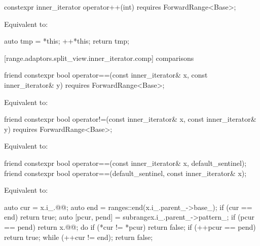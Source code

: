 {{\color{oldclr}
%
\begin{itemdecl}
constexpr inner_iterator operator++(int) requires ForwardRange<Base>;
\end{itemdecl}

\begin{itemdescr}
\pnum
\effects Equivalent to:
\begin{codeblock}
auto tmp = *this;
++*this;
return tmp;
\end{codeblock}
\end{itemdescr}
} %

[range.adaptors.split_view.inner_iterator.comp]{ comparisons}

%
\begin{itemdecl}
friend constexpr bool operator==(const inner_iterator& x, const inner_iterator& y)
  requires ForwardRange<Base>;
\end{itemdecl}

\begin{itemdescr}
\pnum
\effects Equivalent to: 
\end{itemdescr}

%
\begin{itemdecl}
friend constexpr bool operator!=(const inner_iterator& x, const inner_iterator& y)
  requires ForwardRange<Base>;
\end{itemdecl}

\begin{itemdescr}
\pnum
\effects Equivalent to: 
\end{itemdescr}

{\color{newclr}
%
\begin{itemdecl}
friend constexpr bool operator==(const inner_iterator& x, default_sentinel);
friend constexpr bool operator==(default_sentinel, const inner_iterator& x);
\end{itemdecl}

\begin{itemdescr}
\pnum
\effects Equivalent to:
\begin{codeblock}
auto cur = x.i_.@@;
auto end = ranges::end(x.i_.parent_->base_);
if (cur == end) return true;
auto [pcur, pend] = subrange{x.i_.parent_->pattern_};
if (pcur == pend) return x.@@;
do {
  if (*cur != *pcur) return false;
  if (++pcur == pend) return true;
} while (++cur != end);
return false;
\end{codeblock}
\end{itemdescr}

}}
